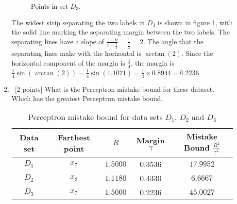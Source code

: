 \begin{enumerate}
\begin{enumerate}
   \begin{figure}[H]
    \centering
    \caption{Points in set $D_3$.} \label{SetD3}
  \end{figure}   

The widest strip separating the two labels in $D_3$ is shown in figure \ref{SetD3}, with the solid line marking the separating margin between the two labels. The separating lines have a slope of $\frac{1-0}{1-\frac{1}{2}} = \frac{1}{\frac{1}{2}}=2$. The angle that the separating lines make with the horizontal is $\arctan(2)$. Since the horizontal component of the margin is $\frac{1}{4}$, the margin is $\frac{1}{4} \sin(\arctan(2)) = \frac{1}{4} \sin(1.1071) =  \frac{1}{4} \times 0.8944 =0.2236$.

  \item ~[2 points] What is the Perceptron mistake bound for these
    dataset. Which has the greatest Perceptron mistake bound.
    
  \begin{table}[H]
    \centering
    \begin{tabular}{| c | c | c | c | c |}
      \hline
      Data set & Farthest point & $R$ & Margin $\gamma$ & Mistake Bound $\frac{R^2}{\gamma^2}$ \\
      \hline
      $D_1$ & $x_7$ & $1.5000$ & 0.3536 &$17.9952$\\
      \hline
      $D_2$ & $x_8$ & $1.1180$ & 0.4330 &$6.6667$\\
      \hline
      $D_3$ & $x_7$ & $1.5000$ & 0.2236 &$45.0027$\\
      \hline
    \end{tabular}
    \caption{Perceptron mistake bound for data sets $D_1$, $D_2$ and $D_3$}
  \end{table}    
    

\end{enumerate}
\end{enumerate}
